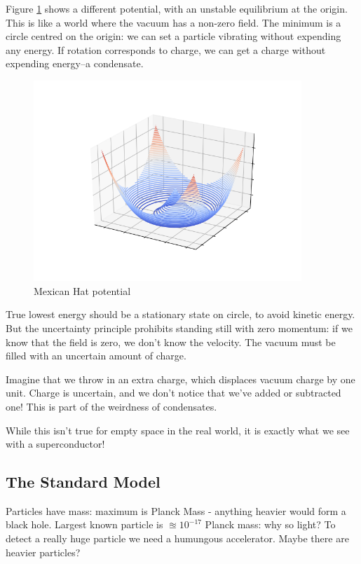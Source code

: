\documentclass[]{article}
\begin{document}
\begin{appendices}
	Figure \ref{fig:mexican-hat} shows a different potential, with an unstable equilibrium at the origin. This is like a world where the vacuum has a non-zero field. The minimum is a circle centred on the origin: we can set a particle vibrating without expending any energy. If rotation corresponds to charge, we can get a charge without expending energy--a condensate.
	\begin{figure}[H]
		\caption{Mexican Hat potential}\label{fig:mexican-hat}
		\includegraphics[width=0.9\textwidth]{mexican-hat}
	\end{figure}

	True lowest energy should be a stationary state on circle, to avoid kinetic energy. But the uncertainty principle prohibits standing still with zero momentum: if we know that the field is zero, we don't know the velocity. The vacuum must be filled with an uncertain amount of charge.
	
	Imagine that we throw in an extra charge, which displaces vacuum charge by one unit. Charge is uncertain, and we don't notice that we've added or subtracted one! This is part of the weirdness of condensates.
	
	While this isn't true for empty space in the real world, it is exactly what we see with a superconductor!
	
	\subsection{The Standard Model}
	
	Particles have mass: maximum is Planck Mass - anything heavier would form a black hole. Largest known particle is $\approxeq 10^{-17}$ Planck mass: why so light? To detect a really huge particle we need a humungous accelerator. Maybe there are heavier particles?
	

\end{appendices}
\end{document}
